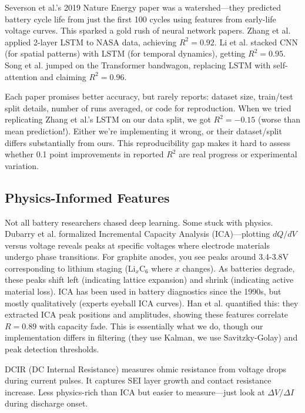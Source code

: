 \documentclass{sn-jnl}
\begin{document}
Severson et al.'s 2019 Nature Energy paper \citep{severson2019} was a watershed—they predicted battery cycle life from just the first 100 cycles using features from early-life voltage curves. This sparked a gold rush of neural network papers. Zhang et al. \citep{zhang2018} applied 2-layer LSTM to NASA data, achieving $R^2 = 0.92$. Li et al. \citep{li2019} stacked CNN (for spatial patterns) with LSTM (for temporal dynamics), getting $R^2 = 0.95$. Song et al. \citep{song2022} jumped on the Transformer bandwagon, replacing LSTM with self-attention and claiming $R^2 = 0.96$.

Each paper promises better accuracy, but rarely reports: dataset size, train/test split details, number of runs averaged, or code for reproduction. When we tried replicating Zhang et al.'s LSTM on our data split, we got $R^2 = -0.15$ (worse than mean prediction!). Either we're implementing it wrong, or their dataset/split differs substantially from ours. This reproducibility gap makes it hard to assess whether 0.1 point improvements in reported $R^2$ are real progress or experimental variation.

\subsection{Physics-Informed Features}
\label{subsec:physics}

Not all battery researchers chased deep learning. Some stuck with physics. Dubarry et al. \citep{dubarry2012} formalized Incremental Capacity Analysis (ICA)—plotting $dQ/dV$ versus voltage reveals peaks at specific voltages where electrode materials undergo phase transitions. For graphite anodes, you see peaks around 3.4-3.8V corresponding to lithium staging (Li$_x$C$_6$ where $x$ changes). As batteries degrade, these peaks shift left (indicating lattice expansion) and shrink (indicating active material loss). ICA has been used in battery diagnostics since the 1990s, but mostly qualitatively (experts eyeball ICA curves). Han et al. \citep{han2014} quantified this: they extracted ICA peak positions and amplitudes, showing these features correlate $R = 0.89$ with capacity fade. This is essentially what we do, though our implementation differs in filtering (they use Kalman, we use Savitzky-Golay) and peak detection thresholds.

DCIR (DC Internal Resistance) measures ohmic resistance from voltage drops during current pulses. It captures SEI layer growth and contact resistance increase. Less physics-rich than ICA but easier to measure—just look at $\Delta V / \Delta I$ during discharge onset.
\end{document}
